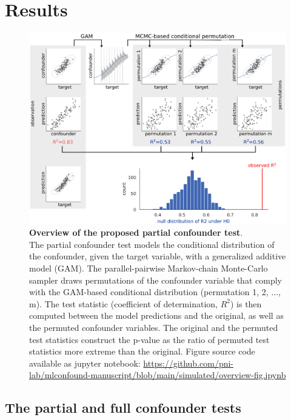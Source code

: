 \documentclass{article}
\begin{document}
\section{Results}

\begin{figure}[!b]
  \centering
  \includegraphics[width=0.6\paperwidth]{fig/overview.eps}
  \caption{\textbf{Overview of the proposed partial confounder test}. \\
    The partial confounder test models the conditional distribution of the confounder, given the target variable, with a generalized additive model (GAM). The parallel-pairwise Markov-chain Monte-Carlo sampler draws permutations of the confounder variable that comply with the GAM-based conditional distribution (permutation 1, 2, ..., m). The test statistic (coefficient of determination, $R^2$) is then computed between the model predictions and the original, as well as the permuted confounder variables. The original and the permuted test statistics construct the p-value as the ratio of permuted test statistics more extreme than the original. Figure source code available as jupyter notebook: \href{https://github.com/pni-lab/mlconfound-manuscript/blob/main/simulated/overview-fig.ipynb}{https://github.com/pni-lab/mlconfound-manuscript/blob/main/simulated/overview-fig.ipynb}
  }
  \label{fig:overview}
\end{figure}


\subsection{The partial and full confounder tests}
\end{document}
